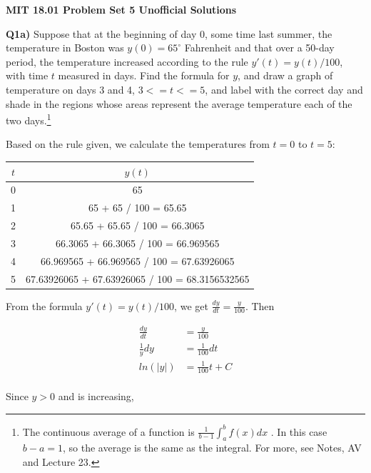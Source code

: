 \documentclass[9pt]{article}
\begin{document}
\begin{center}
  \large\textbf{MIT 18.01 Problem Set 5 Unofficial Solutions}
\end{center}

\begin{tcolorbox}
  \textbf{Q1a)} Suppose that at the beginning of day 0, some time last summer, the temperature in Boston was $y(0) = 65^{\circ}$ Fahrenheit and that over a 50-day period, the temperature increased according to the rule $y'(t) = y(t) / 100$, with time $t$ measured in days. Find the formula for $y$, and draw a graph of temperature on days 3 and 4, $3 <= t <= 5$, and label with the correct day and shade in the regions whose areas represent the average temperature each of the two days.\footnote{The continuous average of a function is $\frac{1}{b - 1} \int_{a}^{b} f(x) dx $ . In this case $b - a = 1$, so the average is the same as the integral. For more, see Notes, AV and Lecture 23.}
\end{tcolorbox}

Based on the rule given, we calculate the temperatures from $t = 0$ to $t = 5$:

\begin{center}
  \begin{tabular}{|c|c|}
    \hline
    \rowcolor{Gray}
    $t$ & $y(t)$ \\ \hline
    0 & 65 \\ \hline
    1 & 65 + 65 / 100 = 65.65 \\ \hline
    2 & 65.65 + 65.65 / 100 = 66.3065 \\ \hline
    3 & 66.3065 + 66.3065 / 100 = 66.969565 \\ \hline
    4 & 66.969565 + 66.969565 / 100 = 67.63926065 \\ \hline
    5 & 67.63926065 + 67.63926065 / 100 = 68.3156532565 \\ \hline
  \end{tabular}
\end{center}

From the formula $y'(t) = y(t) / 100$, we get $\frac{dy}{dt} = \frac{y}{100}$. Then

\begin{align*}
  \frac{dy}{dt} &= \frac{y}{100} \\
  \frac{1}{y} dy &= \frac{1}{100} dt \\
  ln(|y|) &= \frac{1}{100} t + C \\
\end{align*}

Since $y > 0$ and is increasing,
\end{document}
